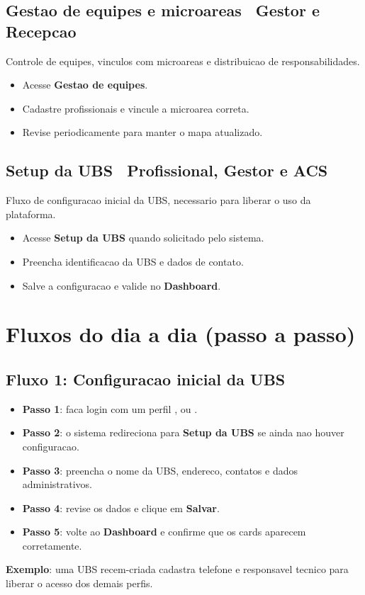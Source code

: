 \documentclass[12pt,a4paper]{article}
\newcommand{\pill}[1]{\tikz[baseline]{\node[fill=BrandBlue!10,draw=BrandBlue!30,rounded corners=4pt,inner xsep=6pt,inner ysep=2pt, text=BrandBlueDark]{\small\textbf{#1}};}}
\begin{document}
\subsection{Gestao de equipes e microareas \textemdash\ Gestor e Recepcao}
Controle de equipes, vinculos com microareas e distribuicao de responsabilidades.
\begin{itemize}[leftmargin=*]
  \item Acesse \textbf{Gestao de equipes}.
  \item Cadastre profissionais e vincule a microarea correta.
  \item Revise periodicamente para manter o mapa atualizado.
\end{itemize}

\subsection{Setup da UBS \textemdash\ Profissional, Gestor e ACS}
Fluxo de configuracao inicial da UBS, necessario para liberar o uso da plataforma.
\begin{itemize}[leftmargin=*]
  \item Acesse \textbf{Setup da UBS} quando solicitado pelo sistema.
  \item Preencha identificacao da UBS e dados de contato.
  \item Salve a configuracao e valide no \textbf{Dashboard}.
\end{itemize}

\section{Fluxos do dia a dia (passo a passo)}

\subsection{Fluxo 1: Configuracao inicial da UBS}
\begin{itemize}[leftmargin=*]
  \item \textbf{Passo 1}: faca login com um perfil \pill{PROFISSIONAL}, \pill{GESTOR} ou \pill{ACS}.
  \item \textbf{Passo 2}: o sistema redireciona para \textbf{Setup da UBS} se ainda nao houver configuracao.
  \item \textbf{Passo 3}: preencha o nome da UBS, endereco, contatos e dados administrativos.
  \item \textbf{Passo 4}: revise os dados e clique em \textbf{Salvar}.
  \item \textbf{Passo 5}: volte ao \textbf{Dashboard} e confirme que os cards aparecem corretamente.
\end{itemize}
\textbf{Exemplo}: uma UBS recem-criada cadastra telefone e responsavel tecnico para liberar o acesso dos demais perfis.
\end{document}
